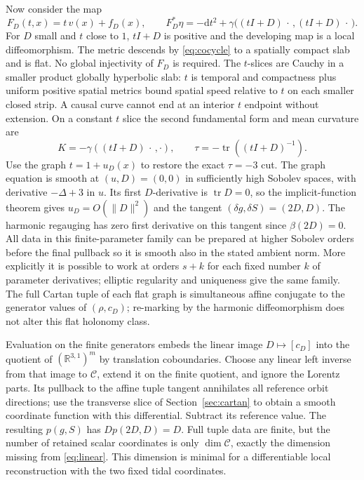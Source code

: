 \documentclass[11pt]{article}
\theoremstyle{remark}
\newcommand{\tr}{\operatorname{tr}}
\newcommand{\Mink}{\mathbb R^{3,1}}
\newcommand{\dd}{\mathrm{d}}
\newcommand{\C}{\mathcal C}
\begin{document}
Now consider the map
\begin{equation}
 F_D(t,x)=t\,v(x)+f_D(x),\qquad
 F_D^*\eta=-\dd t^2+\gamma\bigl((tI+D)\,\cdot\,,(tI+D)\,\cdot\,\bigr).
 \label{eq:flatfamily}
\end{equation}
For \(D\) small and \(t\) close to \(1\), \(tI+D\) is positive and the developing map is a local diffeomorphism. The metric descends by \eqref{eq:cocycle} to a spatially compact slab and is flat. No global injectivity of \(F_D\) is required. The \(t\)-slices are Cauchy in a smaller product globally hyperbolic slab: \(t\) is temporal and compactness plus uniform positive spatial metrics bound spatial speed relative to \(t\) on each smaller closed strip. A causal curve cannot end at an interior \(t\) endpoint without extension. On a constant \(t\) slice the second fundamental form and mean curvature are
\[
 K=-\gamma((tI+D)\,\cdot\,,\cdot),\qquad
 \tau=-\tr((tI+D)^{-1}).
\]
Use the graph \(t=1+u_D(x)\) to restore the exact \(\tau=-3\) cut. The graph equation is smooth at \((u,D)=(0,0)\) in sufficiently high Sobolev spaces, with derivative \(-\Delta+3\) in \(u\). Its first \(D\)-derivative is \(\tr D=0\), so the implicit-function theorem gives \(u_D=O(\|D\|^2)\) and the tangent \((\delta g,\delta S)=(2D,D)\). The harmonic regauging has zero first derivative on this tangent since \(\beta(2D)=0\). All data in this finite-parameter family can be prepared at higher Sobolev orders before the final pullback so it is smooth also in the stated ambient norm. More explicitly it is possible to work at orders \(s+k\) for each fixed number \(k\) of parameter derivatives; elliptic regularity and uniqueness give the same family. The full Cartan tuple of each flat graph is simultaneous affine conjugate to the generator values of \((\rho,c_D)\); re-marking by the harmonic diffeomorphism does not alter this flat holonomy class.

Evaluation on the finite generators embeds the linear image \(D\mapsto[c_D]\) into the quotient of \((\Mink)^m\) by translation coboundaries. Choose any linear left inverse from that image to \(\C\), extend it on the finite quotient, and ignore the Lorentz parts. Its pullback to the affine tuple tangent annihilates all reference orbit directions; use the transverse slice of Section~\ref{sec:cartan} to obtain a smooth coordinate function with this differential. Subtract its reference value. The resulting \(p(g,S)\) has \(Dp(2D,D)=D\). Full tuple data are finite, but the number of retained scalar coordinates is only \(\dim\C\), exactly the dimension missing from \eqref{eq:linear}. This dimension is minimal for a differentiable local reconstruction with the two fixed tidal coordinates.
\end{document}
